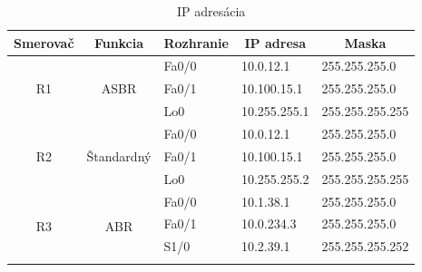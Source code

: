 \documentclass[12pt,twoside,a4paper]{report}
\begin{document}
\begin{table}[!htb]
\centering
\caption{IP adresácia}
\label{tab:ip_adresacia}
\begin{tabular}{|c|c|l|l|l|}
\hline
\multicolumn{1}{|c|}{\textbf{Smerovač}}    & \multicolumn{1}{c|}{\textbf{Funkcia}}                        & \multicolumn{1}{c|}{\textbf{Rozhranie}} & \multicolumn{1}{c|}{\textbf{IP adresa}} & \multicolumn{1}{c|}{\textbf{Maska}} \\ \hline
\multirow{3}{*}{R1}  & \multirow{3}{*}{ASBR}                   & Fa0/0                                   & 10.0.12.1                               & 255.255.255.0                       \\ \cline{3-5} 
                     &                                         & Fa0/1                                   & 10.100.15.1                             & 255.255.255.0                       \\ \cline{3-5} 
                     &                                         & Lo0                                     & 10.255.255.1                            & 255.255.255.255                     \\ \hline
\multirow{3}{*}{R2}  & \multirow{3}{*}{Štandardný}             & Fa0/0                                   & 10.0.12.1                               & 255.255.255.0                       \\ \cline{3-5} 
                     &                                         & Fa0/1                                   & 10.100.15.1                             & 255.255.255.0                       \\ \cline{3-5} 
                     &                                         & Lo0                                     & 10.255.255.2                            & 255.255.255.255                     \\ \hline
\multirow{4}{*}{R3}  & \multirow{4}{*}{ABR}                    & Fa0/0                                   & 10.1.38.1                               & 255.255.255.0                       \\ \cline{3-5} 
                     &                                         & Fa0/1                                   & 10.0.234.3                              & 255.255.255.0                       \\ \cline{3-5} 
                     &                                         & S1/0                                    & 10.2.39.1                               & 255.255.255.252                     \\ \cline{3-5} 

\end{tabular}
\end{table}
\end{document}
